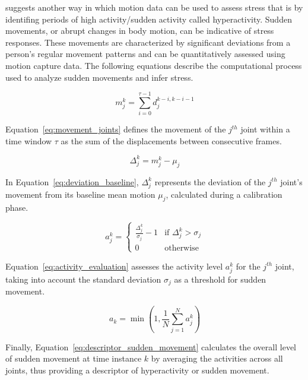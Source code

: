 \textcite{hyperactivity} suggests another way in which motion data can be used to assess stress that is by identifing periods of
high activity/sudden activity called hyperactivity.
Sudden movements, or abrupt changes in body motion, can be indicative of stress responses. These movements are characterized by significant deviations from a person's regular movement patterns and can be quantitatively assessed using motion capture data. The following equations describe the computational process used to analyze sudden movements and infer stress.

\begin{equation}
m_j^k = \sum_{i=0}^{\tau-1} d_j^{k-i,k-i-1}
\label{eq:movement_joints}
\end{equation}

Equation~\ref{eq:movement_joints} defines the movement of the \( j^{th} \) joint within a time window \( \tau \) as the sum of the displacements between consecutive frames. 

\begin{equation}
\Delta_j^k = m_j^k - \mu_j
\label{eq:deviation_baseline}
\end{equation}

In Equation~\ref{eq:deviation_baseline}, \( \Delta_j^k \) represents the deviation of the \( j^{th} \) joint's movement from its baseline mean motion \( \mu_j \), calculated during a calibration phase.

\begin{equation}
a_j^k = 
\begin{cases} 
  \frac{\Delta_j^k}{\sigma_j} - 1 & \text{if } \Delta_j^k > \sigma_j \\
  0 & \text{otherwise}
\end{cases}
\label{eq:activity_evaluation}
\end{equation}

Equation~\ref{eq:activity_evaluation} assesses the activity level \( a_j^k \) for the \( j^{th} \) joint, taking into account the standard deviation \( \sigma_j \) as a threshold for sudden movement.

\begin{equation}
a_k = \min \left( 1, \frac{1}{N} \sum_{j=1}^{N} a_j^k \right)
\label{eq:descriptor_sudden_movement}
\end{equation}

Finally, Equation~\ref{eq:descriptor_sudden_movement} calculates the overall level of sudden movement at time instance \( k \) by averaging the activities across all joints, thus providing a descriptor of hyperactivity or sudden movement.

